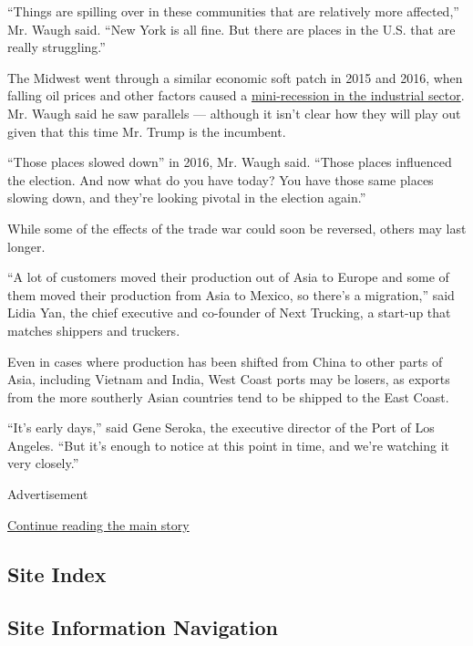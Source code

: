 ``Things are spilling over in these communities that are relatively more
affected,'' Mr. Waugh said. ``New York is all fine. But there are places
in the U.S. that are really struggling.''

The Midwest went through a similar economic soft patch in 2015 and 2016,
when falling oil prices and other factors caused a
\href{https://www.nytimes3xbfgragh.onion/2018/09/29/upshot/mini-recession-2016-little-known-big-impact.html}{mini-recession
in the industrial sector}. Mr. Waugh said he saw parallels --- although
it isn't clear how they will play out given that this time Mr. Trump is
the incumbent.

``Those places slowed down'' in 2016, Mr. Waugh said. ``Those places
influenced the election. And now what do you have today? You have those
same places slowing down, and they're looking pivotal in the election
again.''

While some of the effects of the trade war could soon be reversed,
others may last longer.

``A lot of customers moved their production out of Asia to Europe and
some of them moved their production from Asia to Mexico, so there's a
migration,'' said Lidia Yan, the chief executive and co-founder of Next
Trucking, a start-up that matches shippers and truckers.

Even in cases where production has been shifted from China to other
parts of Asia, including Vietnam and India, West Coast ports may be
losers, as exports from the more southerly Asian countries tend to be
shipped to the East Coast.

``It's early days,'' said Gene Seroka, the executive director of the
Port of Los Angeles. ``But it's enough to notice at this point in time,
and we're watching it very closely.''

Advertisement

\protect\hyperlink{after-bottom}{Continue reading the main story}

\hypertarget{site-index}{%
\subsection{Site Index}\label{site-index}}

\hypertarget{site-information-navigation}{%
\subsection{Site Information
Navigation}\label{site-information-navigation}}

